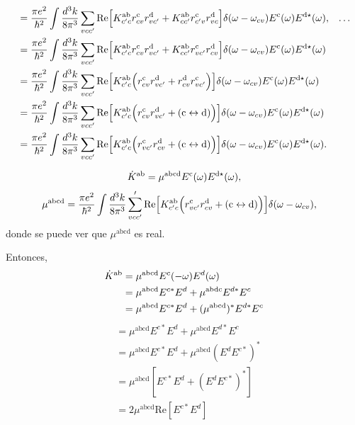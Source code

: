 \documentclass{article}
\begin{document}
\begin{align}
& =
\frac{\pi e^2}{\hbar^2}
\int\frac{d^3k}{8\pi^3}
\sum_{vcc'}
\mathrm{Re}
\Big[ 
K^{\mathrm{a}\mathrm{b}}_{c'c} 
r^{\mathrm{c}}_{cv}r^{\mathrm{d}}_{vc'}
+ 
K^{\mathrm{a}\mathrm{b}}_{cc'} 
r^{\mathrm{c}}_{c'v}r^{\mathrm{d}}_{vc}
\Big]
\delta(\omega-\omega_{cv})  
E^{\mathrm{c}}(\omega)E^{\mathrm{d}\star}(\omega) 
,
& \ldots \nonumber \\
&=
\frac{\pi e^2}{\hbar^2}
\int\frac{d^3k}{8\pi^3}
\sum_{vcc'}
\mathrm{Re}
\Big[
K^{\mathrm{a}\mathrm{b}}_{c'c}
r^{\mathrm{c}}_{cv}r^{\mathrm{d}}_{vc'}
+
K^{\mathrm{a}\mathrm{b}}_{cc'}
r^{\mathrm{c}}_{vc'}r^{\mathrm{d}}_{cv}
\Big]
\delta(\omega-\omega_{cv}) 
E^{\mathrm{c}}(\omega)E^{\mathrm{d}\star}(\omega) 
\nonumber\\
&=
\frac{\pi e^2}{\hbar^2}
\int\frac{d^3k}{8\pi^3}
\sum_{vcc'}
\mathrm{Re}\Big[
K^{\mathrm{a}\mathrm{b}}_{c'c}
\Big(
r^{\mathrm{c}}_{cv}r^{\mathrm{d}}_{vc'}
+
r^{\mathrm{d}}_{cv} r^{\mathrm{c}}_{vc'}
\Big) 
\Big]
\delta(\omega-\omega_{cv}) 
E^{\mathrm{c}}(\omega)E^{\mathrm{d}\star}(\omega) 
\nonumber\\
&=
\frac{\pi e^2}{\hbar^2}
\int\frac{d^3k}{8\pi^3}
\sum_{vcc'}
\mathrm{Re}\Big[
K^{\mathrm{a}\mathrm{b}}_{c'c}
\Big(
r^{\mathrm{c}}_{cv}r^{\mathrm{d}}_{vc'}
+
(\mathrm{c}\leftrightarrow\mathrm{d}) 
\Big) 
\Big]
\delta(\omega-\omega_{cv}) 
E^{\mathrm{c}}(\omega)E^{\mathrm{d}\star}(\omega) 
\nonumber\\
&=
\frac{\pi e^2}{\hbar^2}
\int\frac{d^3k}{8\pi^3}
\sum_{vcc'}
\mathrm{Re}\Big[
K^{\mathrm{a}\mathrm{b}}_{c'c}
\Big(
r^{\mathrm{c}}_{vc'} r^{\mathrm{d}}_{cv}
+
(\mathrm{c}\leftrightarrow\mathrm{d}) 
\Big) 
\Big]
\delta(\omega-\omega_{cv}) 
E^{\mathrm{c}}(\omega)E^{\mathrm{d}\star}(\omega) 
.
\end{align} 

 \begin{align}\label{8.e}
\dot K^{\mathrm{a}\mathrm{b}}
=
\mu^{\mathrm{abcd}} 
E^{\mathrm{c}}(\omega)E^{\mathrm{d}\star}(\omega) 
,
\end{align}
\begin{align}\label{9.e}
\mu^{\mathrm{abcd}}
&=
\frac{\pi e^2}{\hbar^2}
\int\frac{d^3k}{8\pi^3}
\sum'_{vcc'}
\mathrm{Re}\Big[ 
K^{\mathrm{a}\mathrm{b}}_{c'c}
\Big( 
r^{\mathrm{c}}_{vc'} r^{\mathrm{d}}_{cv}
+
(\mathrm{c}\leftrightarrow\mathrm{d}) 
\Big) 
\Big]
\delta(\omega-\omega_{cv}) 
,
\end{align}
donde se puede ver que $\mu^{\mathrm{abcd}}$ es real.

Entonces, 
\begin{align}
\dot K^{\mathrm{a}\mathrm{b}} &= \mu^{\mathrm{abcd}} E^{c}(-\omega)E^{d}(\omega) \nonumber\\
&= \mu^{\mathrm{abcd}} E^{c*} E^{d} + \mu^{\mathrm{abdc}} E^{d*} E^{c} \nonumber\\
&= \mu^{\mathrm{abcd}} E^{c*} E^{d} + (\mu^{\mathrm{abcd}})^{*} E^{d*} E^{c}
\end{align}
\begin{align}
&= \mu^{\mathrm{abcd}} E^{c*} E^{d} + \mu^{\mathrm{abcd}} E^{d*} E^{c} \nonumber\\    
&= \mu^{\mathrm{abcd}} E^{c*} E^{d} + \mu^{\mathrm{abcd}} (E^{d} E^{c*})^{*} \nonumber\\    
&= \mu^{\mathrm{abcd}} [E^{c*} E^{d} + (E^{d} E^{c*})^{*}] \nonumber\\    
&= 2 \mu^{\mathrm{abcd}} \mathrm{Re} [E^{c*} E^{d}]
\end{align}
\end{document}
